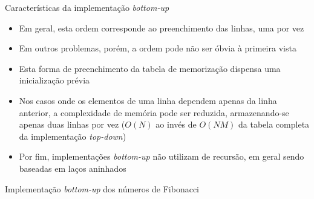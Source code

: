 \begin{frame}[fragile]{Características da implementação {\it bottom-up}}

    \begin{itemize}
        \item Em geral, esta ordem corresponde ao preenchimento das linhas, uma por vez
        \pause

        \item Em outros problemas, porém, a ordem pode não ser óbvia à primeira vista
        \pause

        \item Esta forma de preenchimento da tabela de memorização dispensa uma inicialização
            prévia
        \pause

        \item Nos casos onde os elementos de uma linha dependem apenas da linha anterior, a
            complexidade de memória pode ser reduzida, armazenando-se apenas duas linhas por
            vez ($O(N)$ ao invés de $O(NM)$ da tabela completa da implementação 
            \textit{top-down})
        \pause

        \item Por fim, implementações \textit{bottom-up} não utilizam de recursão, em geral
            sendo baseadas em laços aninhados
    \end{itemize}

\end{frame}

\begin{frame}[fragile]{Implementação {\it bottom-up} dos números de Fibonacci}
\end{frame}

